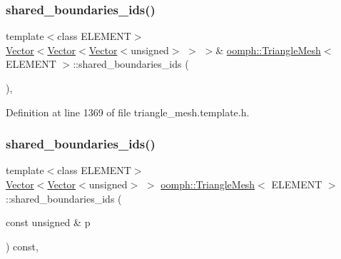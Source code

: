 \subsubsection{\texorpdfstring{shared\+\_\+boundaries\+\_\+ids()}{shared\_boundaries\_ids()}\hspace{0.1cm}{\footnotesize\ttfamily [2/7]}}
{\footnotesize\ttfamily template$<$class E\+L\+E\+M\+E\+NT$>$ \\
\hyperlink{classoomph_1_1Vector}{Vector}$<$\hyperlink{classoomph_1_1Vector}{Vector}$<$\hyperlink{classoomph_1_1Vector}{Vector}$<$unsigned$>$ $>$ $>$\& \hyperlink{classoomph_1_1TriangleMesh}{oomph\+::\+Triangle\+Mesh}$<$ E\+L\+E\+M\+E\+NT $>$\+::shared\+\_\+boundaries\+\_\+ids (\begin{DoxyParamCaption}{ }\end{DoxyParamCaption})\hspace{0.3cm}{\ttfamily [inline]}, {\ttfamily [protected]}}



Definition at line 1369 of file triangle\+\_\+mesh.\+template.\+h.

\mbox{\label{classoomph_1_1TriangleMesh_a399b49dae233992723e710e8c7e06992}} 
\subsubsection{\texorpdfstring{shared\+\_\+boundaries\+\_\+ids()}{shared\_boundaries\_ids()}\hspace{0.1cm}{\footnotesize\ttfamily [3/7]}}
{\footnotesize\ttfamily template$<$class E\+L\+E\+M\+E\+NT$>$ \\
\hyperlink{classoomph_1_1Vector}{Vector}$<$\hyperlink{classoomph_1_1Vector}{Vector}$<$unsigned$>$ $>$ \hyperlink{classoomph_1_1TriangleMesh}{oomph\+::\+Triangle\+Mesh}$<$ E\+L\+E\+M\+E\+NT $>$\+::shared\+\_\+boundaries\+\_\+ids (\begin{DoxyParamCaption}\item[{const unsigned \&}]{p }\end{DoxyParamCaption}) const\hspace{0.3cm}{\ttfamily [inline]}, {\ttfamily [protected]}}



